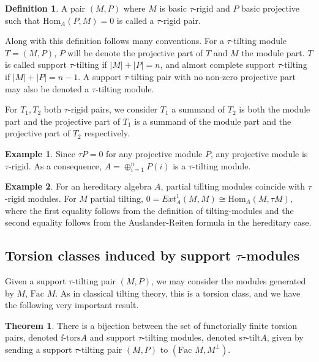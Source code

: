 \documentclass[]{article}
\theoremstyle{definition}
\newtheorem{definition}{Definition}[section]
\newtheorem{theorem}{Theorem}[section]
\newtheorem{example}{Example}[section]
\newcommand{\Hom}{\ensuremath{\text{Hom}}}
\newcommand{\tu}{\ensuremath{\tau}}
\newcommand{\Fac}{\ensuremath{\text{Fac }}}
\begin{document}
\begin{definition}\cite[Definition 0.3]{tau}
	A pair $(M,P)$ where $M$ is basic $\tau$-rigid and $P$ basic projective such that $\Hom_A(P,M) = 0$ is called a  $\tau$-rigid pair.
\end{definition}

Along with this definition follows many conventions. For a  $\tau$-tilting module $T = (M,P)$, $P$ will be denote the projective part of $T$ and $M$ the module part. $T$ is called support \tu-tilting if $|M| + |P| = n$, and almost complete support \tu-tilting if $|M| + |P| = n - 1$. A support \tu-tilting pair with no non-zero projective part may also be denoted a \tu-tilting module. 

For $T_1,T_2$ both \tu-rigid pairs, we consider $T_1$ a summand of $T_2$ is both the module part and the projective part of $T_1$ is a summand of the module part and the projective part of $T_2$ respectively.

\begin{example}
	Since $\tu P = 0$ for any projective module $P$, any projective module is \tu-rigid. As a consequence, $A = \oplus_{i = 1}^n P(i)$ is a \tu-tilting module.	
\end{example}

\begin{example}
	For an hereditary algebra $A$, partial tillting modules coincide with \tu-rigid modules. For $M$ partial tilting, $0 = Ext^1_A(M,M) \cong \Hom_A(M,\tu M)$, where the first equality follows from the definition of tilting-modules and the second equality follows from the Auslander-Reiten formula in the hereditary case.
\end{example}

\subsection{Torsion classes induced by support \tu-modules}
Given a support \tu-tilting pair $(M,P)$, we may consider the modules generated by $M$, $\Fac M$. As in classical tilting theory, this is a torsion class, and we have the following very important result.

\begin{theorem}\cite[Theorem 2.7]{tau}\cite{auslandersmalo81}
	There is a bijection between the set of functorially finite torsion pairs, denoted $\text{f-tors} A$ and support \tu-tilting modules, denoted $\text{s}\tu\text{-tilt} A$, given by sending a support \tu-tilting pair $(M,P)$ to $(\Fac M,M^\perp)$.
\end{theorem}
\end{document}
